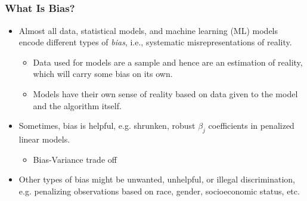 \documentclass[11pt,
               		aspectratio=169,
               		hyperref={colorlinks}
               		]{beamer}
\begin{document}
		\subsection*{}
		\begin{frame}
			\frametitle{What Is Bias?}			
			\begin{itemize}
			\Large
			\item Almost all data, statistical models, and machine learning (ML) models encode different types of \textit{bias}, i.e., systematic misrepresentations of reality.\\
  			\begin{itemize}
  			  \item \tiny{Data used for models are a sample and hence are an estimation of reality, which will carry some bias on its own.}
  			  \item \tiny{Models have their own sense of reality based on data given to the model and the algorithm itself.}
  			\end{itemize}
			\item Sometimes, bias is helpful, e.g. shrunken, robust $\beta_j$ coefficients in penalized linear models.\\
			  \begin{itemize}
			    \item \tiny{Bias-Variance trade off}
			  \end{itemize}
			\item Other types of bias might be unwanted, unhelpful, or illegal discrimination, e.g. penalizing observations based on race, gender, socioeconomic status, etc.
			\end{itemize}
		\end{frame}					
\end{document}
